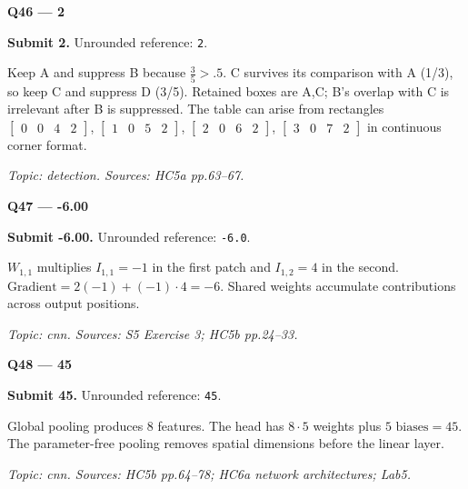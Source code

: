 \documentclass[11pt,a4paper]{article}
\begin{document}
\begin{minipage}{\linewidth}
\textbf{Q46 — 2}\par\smallskip
\textbf{Submit 2.} Unrounded reference: \texttt{2}.\par
Keep A and suppress B because \(\frac{3}{5}>.5\). C survives its comparison with A (1/\allowbreak{}3),\allowbreak{} so keep C and suppress D (3/\allowbreak{}5). Retained boxes are A,\allowbreak{}C; B's overlap with C is irrelevant after B is suppressed. The table can arise from rectangles \(\begin{bmatrix}0&0&4&2\end{bmatrix}\),\allowbreak{} \(\begin{bmatrix}1&0&5&2\end{bmatrix}\),\allowbreak{} \(\begin{bmatrix}2&0&6&2\end{bmatrix}\),\allowbreak{} \(\begin{bmatrix}3&0&7&2\end{bmatrix}\) in continuous corner format.\par
{\small\itshape Topic: detection. Sources: HC5a pp.63–67.}

\end{minipage}
\par\vspace{12pt}
\begin{minipage}{\linewidth}
\textbf{Q47 — -6.00}\par\smallskip
\textbf{Submit -6.00.} Unrounded reference: \texttt{-6.0}.\par
\(W_{1,1}\) multiplies \(I_{1,1}=-1\) in the first patch and \(I_{1,2}=4\) in the second. \(\text{Gradient}=2(-1)+(-1)\cdot4=-6\). Shared weights accumulate contributions across output positions.\par
{\small\itshape Topic: cnn. Sources: S5 Exercise 3; HC5b pp.24–33.}

\end{minipage}
\par\vspace{12pt}
\begin{minipage}{\linewidth}
\textbf{Q48 — 45}\par\smallskip
\textbf{Submit 45.} Unrounded reference: \texttt{45}.\par
Global pooling produces 8 features. The head has \(8\cdot5\) weights plus \(5\text{ biases}=45\). The parameter-free pooling removes spatial dimensions before the linear layer.\par
{\small\itshape Topic: cnn. Sources: HC5b pp.64–78; HC6a network architectures; Lab5.}

\end{minipage}
\end{document}
